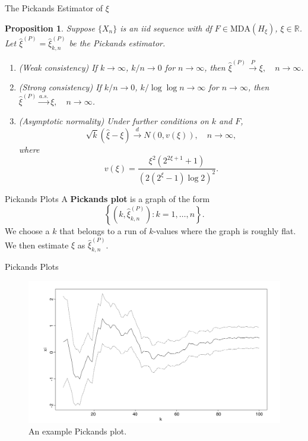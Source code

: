 \documentclass{beamer}
\newcommand{\MDA}{\text{MDA}}
\newtheorem{proposition}{Proposition}
\begin{document}
\begin{frame}{The Pickands Estimator of $\xi$}
    \begin{proposition}
        Suppose $\{X_n\}$ is an iid sequence with df $F \in \MDA(H_{\xi})$, $\xi \in \mathbb{R}$. Let $\hat{\xi}^{(P)} = \hat{\xi}_{k, n}^{(P)}$ be the Pickands estimator.
        \begin{enumerate}
            \item[(a)] (Weak consistency) If $k \to \infty$, $k / n \to 0$ for $n \to \infty$, then $\hat{\xi}^{(P)} \xrightarrow{P} \xi, \quad n \to \infty$.
            \item[(b)] (Strong consistency) If $k / n \to 0$, $k / \log\log n \to \infty$ for $n \to \infty$, then 
            $\hat{\xi}^{(P)} \xrightarrow{a.s.} \xi, \quad n \to \infty$.
            \item[(c)] (Asymptotic normality) Under further conditions on $k$ and $F$,
            \[
            \sqrt{k}(\hat{\xi} - \xi) \xrightarrow{d} N(0, v(\xi)), \quad n \to \infty,
            \]
            where
            \[
            v(\xi) = \frac{\xi^2(2^{2\xi + 1} + 1)}{(2(2^{\xi} - 1)\log 2)^2}.
            \]
        \end{enumerate}
    \end{proposition}    
\end{frame}

\begin{frame}{Pickands Plots}
    A \textbf{Pickands plot} is a graph of the form
    \[
    \left\{\left(k, \hat{\xi}_{k, n}^{(P)}\right) : k = 1, \ldots, n\right\}.
    \]
    We choose a $k$ that belongs to a run of $k$-values where the graph is roughly flat. We then estimate $\xi$ as $\hat{\xi}_{k, n}^{(P)}$.
\end{frame}

\begin{frame}{Pickands Plots}
    \begin{figure}
        \centering
        \includegraphics[scale=0.35]{pickands_plot.png}
        \caption{An example Pickands plot.}
        \label{fig:pickands_plot}
    \end{figure}
\end{frame}
\end{document}
